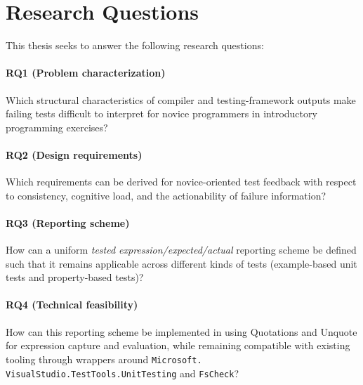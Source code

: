 \section{Research Questions} %
  \label{Research Questions} %


\improve


This thesis seeks to answer the following research questions:


\paragraph{RQ1 (Problem characterization)}
    \label{RQ1 (Problem characterization)}
Which structural characteristics of compiler and testing-framework outputs make failing
tests difficult to interpret for novice programmers in introductory programming exercises?


\paragraph{RQ2 (Design requirements)}
    \label{RQ2 (Design requirements)}
Which requirements can be derived for novice-oriented test feedback with
respect to consistency, cognitive load, and the actionability of failure information?


\paragraph{RQ3 (Reporting scheme)}
    \label{RQ3 (Reporting scheme)}
How can a uniform \emph{tested expression/expected/actual} reporting scheme be defined
such that it remains applicable across different kinds of tests (example-based unit tests
and property-based tests)?


\paragraph{RQ4 (Technical feasibility)}
    \label{RQ4 (Technical feasibility)}
How can this reporting scheme be implemented in \fs{} using Quotations and Unquote for expression
capture and evaluation, while remaining compatible with existing tooling through wrappers around
\texttt{Microsoft.\\VisualStudio.TestTools.UnitTesting} and \texttt{FsCheck}?


